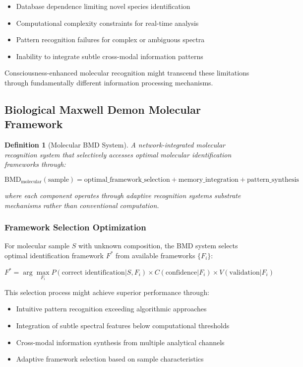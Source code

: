 \documentclass[11pt,a4paper]{article}
\newtheorem{definition}[theorem]{Definition}
\theoremstyle{remark}
\begin{document}
\begin{itemize}
\item Database dependence limiting novel species identification
\item Computational complexity constraints for real-time analysis
\item Pattern recognition failures for complex or ambiguous spectra
\item Inability to integrate subtle cross-modal information patterns
\end{itemize}

Consciousness-enhanced molecular recognition might transcend these limitations through fundamentally different information processing mechanisms.

\subsection{Biological Maxwell Demon Molecular Framework}

\begin{definition}[Molecular BMD System]
A network-integrated molecular recognition system that selectively accesses optimal molecular identification frameworks through:

$$\text{BMD}_{\text{molecular}}(\text{sample}) = \text{optimal\_framework\_selection} + \text{memory\_integration} + \text{pattern\_synthesis}$$

where each component operates through adaptive recognition systems substrate mechanisms rather than conventional computation.
\end{definition}

\subsubsection{Framework Selection Optimization}

For molecular sample $S$ with unknown composition, the BMD system selects optimal identification framework $F^*$ from available frameworks $\{F_i\}$:

$$F^* = \arg\max_{F_i} P(\text{correct identification}|S, F_i) \times C(\text{confidence}|F_i) \times V(\text{validation}|F_i)$$

This selection process might achieve superior performance through:
\begin{itemize}
\item Intuitive pattern recognition exceeding algorithmic approaches
\item Integration of subtle spectral features below computational thresholds
\item Cross-modal information synthesis from multiple analytical channels
\item Adaptive framework selection based on sample characteristics
\end{itemize}
\end{document}
